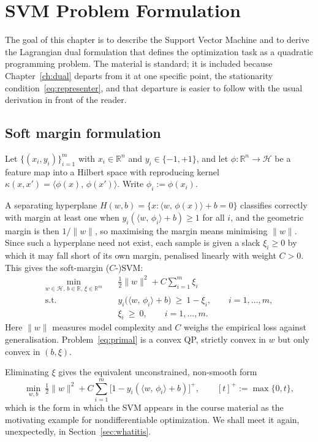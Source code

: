 \documentclass[11pt,a4paper]{report}
\newcommand{\R}{\mathbb{R}}
\newcommand{\Hs}{\mathcal{H}}
\newcommand{\inner}[2]{\langle #1,\, #2 \rangle}
\begin{document}
\chapter{SVM Problem Formulation}
\label{ch:svm}

The goal of this chapter is to describe the Support Vector Machine and to derive the
Lagrangian dual formulation that defines the optimization task as a quadratic
programming problem. The material is standard; it is included because
Chapter~\ref{ch:dual} departs from it at one specific point, the stationarity
condition~\eqref{eq:representer}, and that departure is easier to follow with the
usual derivation in front of the reader.

\section{Soft margin formulation}
Let $\{(x_i,y_i)\}_{i=1}^m$ with $x_i\in\R^n$ and $y_i\in\{-1,+1\}$, and let
$\phi:\R^n\to\Hs$ be a feature map into a Hilbert space with reproducing kernel
$\kappa(x,x')=\inner{\phi(x)}{\phi(x')}$. Write $\phi_i:=\phi(x_i)$.

A separating hyperplane $H(w,b)=\{x:\inner{w}{\phi(x)}+b=0\}$ classifies correctly
with margin at least one when $y_i(\inner{w}{\phi_i}+b)\ge1$ for all $i$, and the
geometric margin is then $1/\|w\|$, so maximising the margin means minimising
$\|w\|$. Since such a hyperplane need not exist, each sample is given a slack
$\xi_i\ge0$ by which it may fall short of its own margin, penalised linearly with
weight $C>0$. This gives the soft-margin ($C$-)SVM:
\begin{equation}
\label{eq:primal}
\tag{P}
\begin{aligned}
\min_{w\in\Hs,\,b\in\R,\,\xi\in\R^m}\quad & \tfrac12\|w\|^2 + C\sum_{i=1}^m \xi_i\\
\text{s.t.}\quad & y_i\bigl(\inner{w}{\phi_i}+b\bigr)\ \ge\ 1-\xi_i, \qquad i=1,\dots,m,\\
& \xi_i\ \ge\ 0, \qquad i=1,\dots,m .
\end{aligned}
\end{equation}
Here $\|w\|$ measures model complexity and $C$ weighs the empirical loss against
generalisation. Problem~\eqref{eq:primal} is a convex QP, strictly convex in $w$ but
only convex in $(b,\xi)$.

Eliminating $\xi$ gives the equivalent unconstrained, non-smooth form
\begin{equation}
\label{eq:hinge}
\min_{w,b}\ \tfrac12\|w\|^2 + C\sum_{i=1}^m\bigl[1-y_i(\inner{w}{\phi_i}+b)\bigr]^+ ,
\qquad [t]^+:=\max\{0,t\},
\end{equation}
which is the form in which the SVM appears in the course material as the motivating
example for nondifferentiable optimization. We shall meet it again, unexpectedly, in
Section~\ref{sec:whatitis}.
\end{document}
